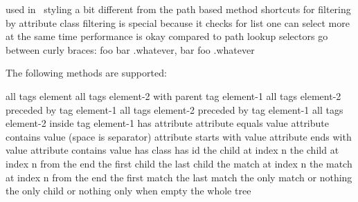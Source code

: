 \startchapter[title=Needed or not?]

\startitemize
\startitem
    used in \HTML\ styling
\stopitem
\startitem
    a bit different from the path based method
\stopitem
\startitem
    shortcuts for filtering by attribute
\stopitem
\startitem
    class filtering is special because it checks for list
\stopitem
\startitem
    one can select more at the same time
\stopitem
\startitem
    performance is okay compared to path lookup
\stopitem
\startitem
    selectors go between curly braces:
    \starttyping
         {{foo bar .whatever, bar foo .whatever}}
    \stoptyping
\stopitem
\stopitemize

\stopchapter

\startchapter[title=Supported methods]

The following methods are supported:

\starttabulate[|T||]
\NC {}                   \NC all tags element \NC \NR
\NC {}     \NC all tags element-2 with parent tag element-1 \NC \NR
\NC {}     \NC all tags element-2 preceded by tag element-1 \NC \NR
\NC {}     \NC all tags element-2 preceded by tag element-1 \NC \NR
\NC {}       \NC all tags element-2 inside tag element-1 \NC \NR
\NC \type {[attribute]}               \NC has attribute \NC \NR
\NC \type {[attribute=value]}         \NC attribute equals value\NC \NR
\NC \type {[attribute~=value]}        \NC attribute contains value (space is separator) \NC \NR
\NC \type {[attribute^="value"]}      \NC attribute starts with value \NC \NR
\NC \type {[attribute$="value"]}      \NC attribute ends with value \NC \NR
\NC \type {[attribute*="value"]}      \NC attribute contains value \NC \NR
\NC {}                    \NC has class \NC \NR
\NC {} \NC has id \NC \NR
\NC {}             \NC the child at index n \NC \NR
\NC {}        \NC the child at index n from the end \NC \NR
\NC {}              \NC the first child \NC \NR
\NC {}               \NC the last child \NC \NR
\NC {}           \NC the match at index n \NC \NR
\NC {}      \NC the match at index n from the end \NC \NR
\NC {}            \NC the first match \NC \NR
\NC {}             \NC the last match \NC \NR
\NC {}             \NC the only match or nothing \NC \NR
\NC {}               \NC the only child or nothing \NC \NR
\NC {}                    \NC only when empty \NC \NR
\NC {}                     \NC the whole tree \NC \NR
\stoptabulate

